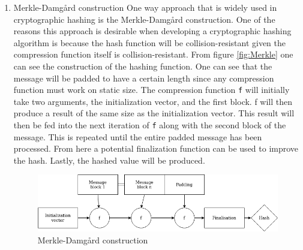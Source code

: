 \documentclass[a4paper]{article}
\begin{document}
\begin{enumerate}
\item Merkle-Damgård construction
\label{sec:orgc096fae}
One way approach that is widely used in cryptographic hashing is the Merkle-Damgård construction. One of the reasons this approach is desirable when developing a cryptographic hashing algorithm is because the hash function will be collision-resistant given the compression function itself is collision-resistant.
From figure \ref{fig:Merkle} one can see the construction of the hashing function. One can see that the message will be padded to have a certain length since any compression function must work on static size. The compression function \texttt{f} will initially take two arguments, the initialization vector, and the first block. f will then produce a result of the same size as the initialization vector. This result will then be fed into the next iteration of \texttt{f} along with the second block of the message. This is repeated until the entire padded message has been processed. From here a potential finalization function can be used to improve the hash. Lastly, the hashed value will be produced.

\begin{figure}[htbp]
\centering
\includegraphics[width=.9\linewidth]{./Merkle.png}
\caption{\label{fig:orgde67947}
Merkle-Damgård construction}
\end{figure}
\end{enumerate}
\end{document}
